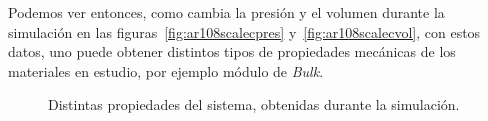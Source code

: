 Podemos ver entonces, como cambia la presi\'on y el volumen durante la simulaci\'on en las figuras~\ref{fig:ar108scalecpres} y~\ref{fig:ar108scalecvol}, con estos datos, uno puede obtener distintos tipos de propiedades mec\'anicas de los materiales en estudio, por ejemplo m\'odulo de \textit{Bulk}.

\begin{figure}[h!]
\centering
{}
\caption{Distintas propiedades del sistema, obtenidas durante la simulaci\'on.}
\label{fig:ar108scalec}
\end{figure}


